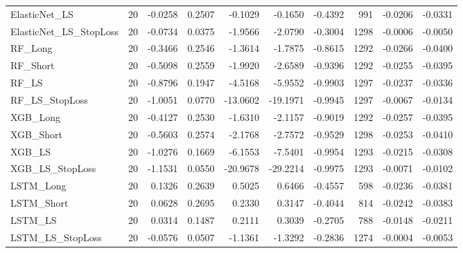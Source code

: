 \begin{tabular}{llrrrrrrrr}
\cline{1-10}
ElasticNet\_LS & 20 & -0.0258 & 0.2507 & -0.1029 & -0.1650 & -0.4392 & 991 & -0.0206 & -0.0331 \\
\cline{1-10}
ElasticNet\_LS\_StopLoss & 20 & -0.0734 & 0.0375 & -1.9566 & -2.0790 & -0.3004 & 1298 & -0.0006 & -0.0050 \\
\cline{1-10}
RF\_Long & 20 & -0.3466 & 0.2546 & -1.3614 & -1.7875 & -0.8615 & 1292 & -0.0266 & -0.0400 \\
\cline{1-10}
RF\_Short & 20 & -0.5098 & 0.2559 & -1.9920 & -2.6589 & -0.9396 & 1292 & -0.0255 & -0.0395 \\
\cline{1-10}
RF\_LS & 20 & -0.8796 & 0.1947 & -4.5168 & -5.9552 & -0.9903 & 1297 & -0.0237 & -0.0336 \\
\cline{1-10}
RF\_LS\_StopLoss & 20 & -1.0051 & 0.0770 & -13.0602 & -19.1971 & -0.9945 & 1297 & -0.0067 & -0.0134 \\
\cline{1-10}
XGB\_Long & 20 & -0.4127 & 0.2530 & -1.6310 & -2.1157 & -0.9019 & 1292 & -0.0257 & -0.0395 \\
\cline{1-10}
XGB\_Short & 20 & -0.5603 & 0.2574 & -2.1768 & -2.7572 & -0.9529 & 1298 & -0.0253 & -0.0410 \\
\cline{1-10}
XGB\_LS & 20 & -1.0276 & 0.1669 & -6.1553 & -7.5401 & -0.9954 & 1293 & -0.0215 & -0.0308 \\
\cline{1-10}
XGB\_LS\_StopLoss & 20 & -1.1531 & 0.0550 & -20.9678 & -29.2214 & -0.9975 & 1293 & -0.0071 & -0.0102 \\
\cline{1-10}
LSTM\_Long & 20 & 0.1326 & 0.2639 & 0.5025 & 0.6466 & -0.4557 & 598 & -0.0236 & -0.0381 \\
\cline{1-10}
LSTM\_Short & 20 & 0.0628 & 0.2695 & 0.2330 & 0.3147 & -0.4044 & 814 & -0.0242 & -0.0383 \\
\cline{1-10}
LSTM\_LS & 20 & 0.0314 & 0.1487 & 0.2111 & 0.3039 & -0.2705 & 788 & -0.0148 & -0.0211 \\
\cline{1-10}
LSTM\_LS\_StopLoss & 20 & -0.0576 & 0.0507 & -1.1361 & -1.3292 & -0.2836 & 1274 & -0.0004 & -0.0053 \\
\cline{1-10}
\bottomrule
\end{tabular}
